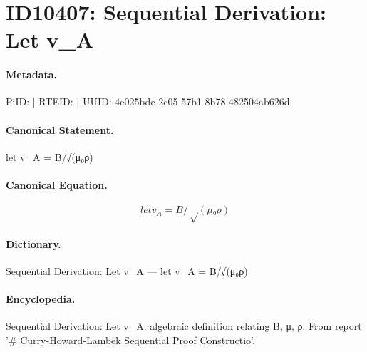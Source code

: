 \section*{ID10407: Sequential Derivation: Let v\_A}
\paragraph{Metadata.}
PiID:  | RTEID:  | UUID: 4e025bde-2c05-57b1-8b78-482504ab626d

\paragraph{Canonical Statement.}
let v\_A = B/√(μ₀ρ)

\paragraph{Canonical Equation.}
\[
let v_A = B/√(μ₀ρ)
\]

\paragraph{Dictionary.}
Sequential Derivation: Let v\_A — let v\_A = B/√(μ₀ρ)

\paragraph{Encyclopedia.}
Sequential Derivation: Let v\_A: algebraic definition relating B, μ, ρ. From report '\# Curry-Howard-Lambek Sequential Proof Constructio'.
